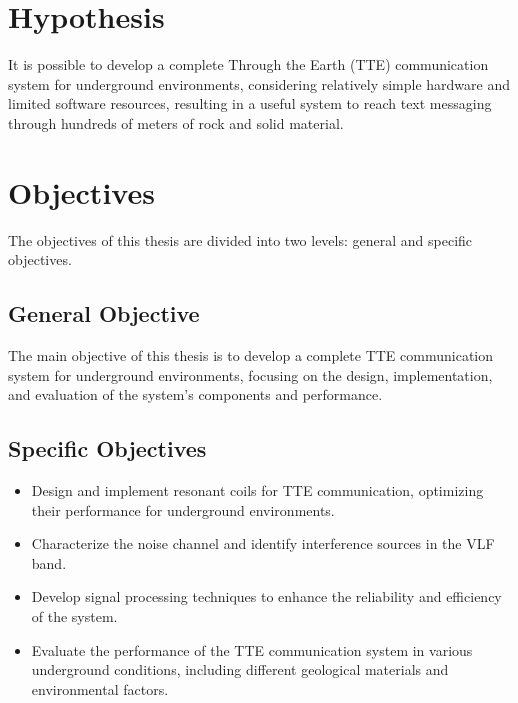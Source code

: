 \section{Hypothesis}
It is possible to develop a complete Through the Earth (TTE) communication system for underground environments, considering relatively simple hardware and limited software resources, resulting in a useful system to reach text messaging through hundreds of meters of rock and solid material.

\section{Objectives}

The objectives of this thesis are divided into two levels: general and specific objectives.
\subsection{General Objective}
The main objective of this thesis is to develop a complete TTE communication system for underground environments, focusing on the design, implementation, and evaluation of the system's components and performance. 
\subsection{Specific Objectives}
\begin{itemize}
    \item Design and implement resonant coils for TTE communication, optimizing their performance for underground environments.
     \item Characterize the noise channel and identify interference sources in the VLF band.
     \item Develop signal processing techniques to enhance the reliability and efficiency of the system.
     \item Evaluate the performance of the TTE communication system in various underground conditions, including different geological materials and environmental factors.
    \end{itemize}
